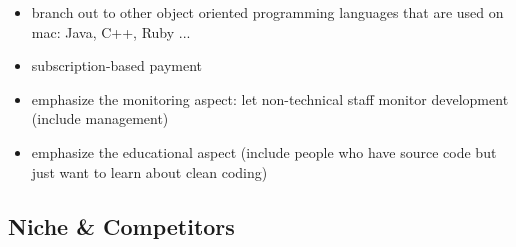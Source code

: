 \documentclass{article}
\begin{document}
\begin{itemize}
	\item branch out to other object oriented programming languages that are used on mac: Java, C++, Ruby ...
	\item subscription-based payment
	\item emphasize the monitoring aspect: let non-technical staff monitor development (include management)
	\item emphasize the educational aspect (include people who have source code but just want to learn about clean coding)
\end{itemize} 

\subsection{Niche \& Competitors}
\end{document}
